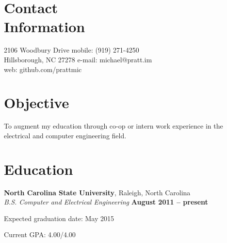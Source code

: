 \documentclass[margin,line,letterpaper]{resume}
\begin{document}
\begin{resume}

    \section{\mysidestyle Contact\\Information}

    2106 Woodbury Drive             \hfill mobile: (919) 271-4250          \vspace{0mm}\\\vspace{0mm}%
    Hillsborough, NC 27278          \hfill e-mail: michael@pratt.im      \vspace{0mm}\\\vspace{0mm}%
                                    \hfill web: github.com/prattmic      \vspace{0mm}\\\vspace{-4.5mm}%


    \section{\mysidestyle Objective}

    To augment my education through co-op or intern work experience
    in the electrical and computer engineering field.


    \section{\mysidestyle Education}

    \textbf{North Carolina State University}, Raleigh, North Carolina \vspace{2mm}\\\vspace{1mm}%
    \textsl{B.S. Computer and Electrical Engineering} \hfill \textbf{ August 2011 -- present}\vspace{-3mm}\\\vspace{-1mm}%
    \begin{list2}
        \item Expected graduation date: May 2015
        \item Current GPA: 4.00/4.00
    \end{list2}\vspace{-1.5mm}



\end{resume}
\end{document}
